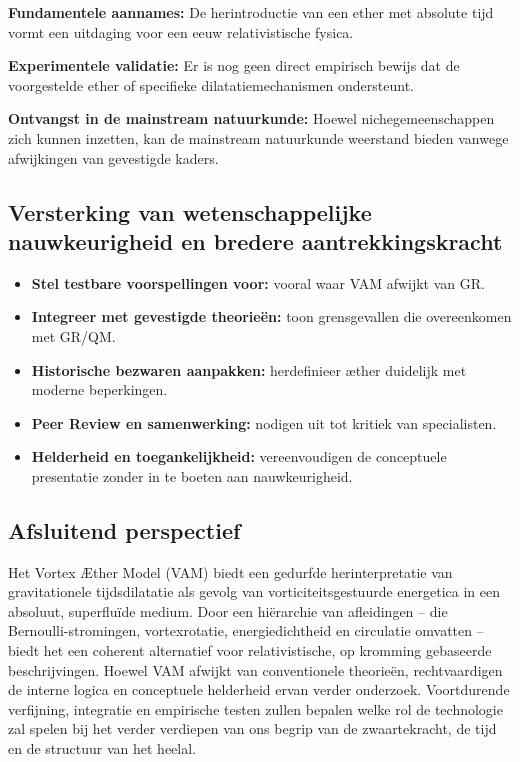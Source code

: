\textbf{Fundamentele aannames:} De herintroductie van een ether met absolute tijd vormt een uitdaging voor een eeuw relativistische fysica.

\textbf{Experimentele validatie:} Er is nog geen direct empirisch bewijs dat de voorgestelde ether of specifieke dilatatiemechanismen ondersteunt.

\textbf{Ontvangst in de mainstream natuurkunde:} Hoewel nichegemeenschappen zich kunnen inzetten, kan de mainstream natuurkunde weerstand bieden vanwege afwijkingen van gevestigde kaders.

\subsection{Versterking van wetenschappelijke nauwkeurigheid en bredere aantrekkingskracht}

\begin{itemize}
\item \textbf{Stel testbare voorspellingen voor:} vooral waar VAM afwijkt van GR.
\item \textbf{Integreer met gevestigde theorieën:} toon grensgevallen die overeenkomen met GR/QM. \item \textbf{Historische bezwaren aanpakken:} herdefinieer æther duidelijk met moderne beperkingen.
\item \textbf{Peer Review en samenwerking:} nodigen uit tot kritiek van specialisten.
\item \textbf{Helderheid en toegankelijkheid:} vereenvoudigen de conceptuele presentatie zonder in te boeten aan nauwkeurigheid.
\end{itemize}

\subsection{Afsluitend perspectief}

Het Vortex Æther Model (VAM) biedt een gedurfde herinterpretatie van gravitationele tijdsdilatatie als gevolg van vorticiteitsgestuurde energetica in een absoluut, superfluïde medium. Door een hiërarchie van afleidingen – die Bernoulli-stromingen, vortexrotatie, energiedichtheid en circulatie omvatten – biedt het een coherent alternatief voor relativistische, op kromming gebaseerde beschrijvingen. Hoewel VAM afwijkt van conventionele theorieën, rechtvaardigen de interne logica en conceptuele helderheid ervan verder onderzoek. Voortdurende verfijning, integratie en empirische testen zullen bepalen welke rol de technologie zal spelen bij het verder verdiepen van ons begrip van de zwaartekracht, de tijd en de structuur van het heelal.